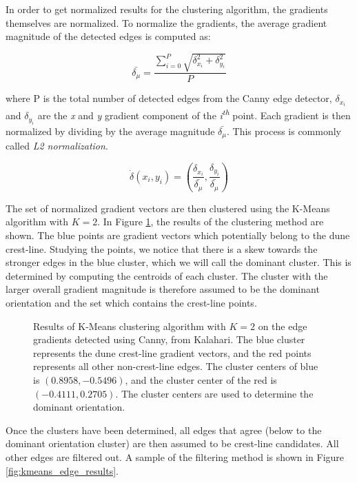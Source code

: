  In order to get normalized results for the clustering algorithm, the gradients themselves are normalized. To normalize the gradients, the average gradient magnitude of the detected edges is computed as:
 
 \begin{equation}
  \bar{\delta_{\mu}}=\frac{\sum_{i=0}^{P}\sqrt{\delta_{x_{i}}^{2}+\delta_{y_{i}}^{2}}}{P}
 \end{equation}

 where P is the total number of detected edges from the Canny edge detector, $\delta_{x_{i}}$ and $\delta_{y_{i}}$ are the \emph{x} and \emph{y} gradient component of the \emph{i\textsuperscript{th}} point. Each gradient is then normalized by dividing by the average magnitude $\bar{\delta_{\mu}}$. This process is commonly called \emph{L2 normalization}.  

 \begin{equation}
 \dot{\delta}\left(x_{i},y_{i}\right)=\left(\frac{\delta_{x_{i}}}{\bar{\delta_{\mu}}},\frac{\delta_{y_{i}}}{\bar{\delta_{\mu}}}\right)
 \end{equation}

 The set of normalized gradient vectors are then clustered using the K-Means algorithm with $K=2$. In Figure \ref{fig:kmeans_results}, the results of the clustering method are shown. The blue points are gradient vectors which potentially belong to the dune crest-line. Studying the points, we notice that there is a skew towards the stronger edges in the blue cluster, which we will call the dominant cluster. This is determined by computing the centroids of each cluster. The cluster with the larger overall gradient magnitude is therefore assumed to be the dominant orientation and the set which contains the crest-line points.
 
 \begin{figure}
 	\centering
 	\caption{Results of K-Means clustering algorithm with $K=2$ on the edge gradients detected using Canny, from Kalahari. The blue cluster represents the dune crest-line gradient vectors, and the red points represents all other non-crest-line edges. The cluster centers of blue is $(0.8958, -0.5496)$, and the cluster center of the red is $(-0.4111, 0.2705)$. The cluster centers are used to determine the dominant orientation.}
 	\label{fig:kmeans_results}
 \end{figure}
 
 Once the clusters have been determined, all edges that agree (below to the dominant orientation cluster) are then assumed to be crest-line candidates. All other edges are filtered out. A sample of the filtering method is shown in Figure \ref{fig:kmeans_edge_results}.
 
